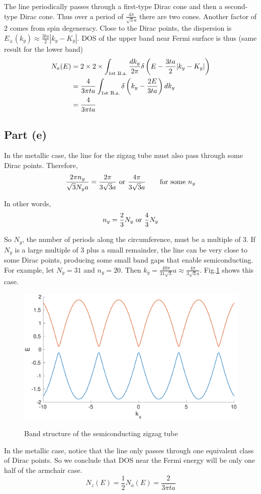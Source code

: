 \documentclass{article}
\begin{document}
The line periodically passes through a first-type Dirac cone and then a second-type Dirac cone. Thus over a period of $\frac{4\pi}{\sqrt{3}a}$ there are two cones. Another factor of $2$ comes from spin degeneracy. Close to the Dirac points, the dispersion is $E_\pm(k_y)\approx\frac{3ta}{2}|k_y-K_y|$. DOS of the upper band near Fermi surface is thus (same result for the lower band)
\begin{align*}
	N_a(E)&=2\times 2\times\int_{\textup{1st B.z.}}\frac{dk_y}{2\pi}\delta\left(E-\frac{3ta}{2}|k_y-K_y|\right)\\
	&=\frac{4}{3\pi ta}\int_{\textup{1st B.z.}}\delta\left(k_y-\frac{2E}{3ta}\right)dk_y\\
	&=\frac{4}{3\pi ta}
\end{align*}

\subsection{Part (e)}
In the metallic case, the line for the zigzag tube must also pass through some Dirac points. Therefore,
\begin{equation*}
\frac{2\pi n_y}{\sqrt{3}N_ya}=\frac{2\pi}{3\sqrt{3}a}\textup{ or }\frac{4\pi}{3\sqrt{3}a}\quad\quad\textup{for some $n_y$}
\end{equation*}

In other words,
\begin{equation*}
n_y=\frac{2}{3}N_y\textup{ or }\frac{4}{3}N_y
\end{equation*}

So $N_y$, the number of periods along the circumference, must be a multiple of $3$. If $N_y$ is a large multiple of $3$ plus a small remainder, the line can be very close to some Dirac points, producing some small band gaps that enable semiconducting. For example, let $N_y=31$ and $n_y=20$. Then $k_y=\frac{40\pi}{31\sqrt{3}}a\approx\frac{4\pi}{3\sqrt{3}a}$. Fig.\ref{zigzag} shows this case.
\begin{figure}[!htbp]
	\centering
	\includegraphics[width=12cm]{zigzag.eps}\\
	\caption{Band structure of the semiconducting zigzag tube}\label{zigzag}
\end{figure}

In the metallic case, notice that the line only passes through one equivalent class of Dirac points. So we conclude that DOS near the Fermi energy will be only one half of the armchair case.
\begin{equation*}
	N_z(E)=\frac{1}{2}N_a(E)=\frac{2}{3\pi ta}
\end{equation*}
\end{document}

